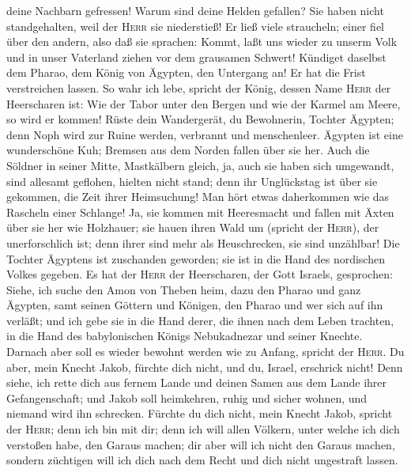 deine Nachbarn gefressen!  Warum sind deine Helden
gefallen? Sie haben nicht standgehalten, weil der \textsc{Herr} sie
niederstieß!  Er ließ viele straucheln; einer fiel über
den andern, also daß sie sprachen: Kommt, laßt uns wieder zu unserm Volk
und in unser Vaterland ziehen vor dem grausamen Schwert! 
Kündiget daselbst dem Pharao, dem König von Ägypten, den Untergang an!
Er hat die Frist verstreichen lassen.  So wahr ich lebe,
spricht der König, dessen Name \textsc{Herr} der Heerscharen ist: Wie
der Tabor unter den Bergen und wie der Karmel am Meere, so wird er
kommen!  Rüste dein Wandergerät, du Bewohnerin, Tochter
Ägypten; denn Noph wird zur Ruine werden, verbrannt und menschenleer.
 Ägypten ist eine wunderschöne Kuh; Bremsen aus dem
Norden fallen über sie her.  Auch die Söldner in seiner
Mitte, Mastkälbern gleich, ja, auch sie haben sich umgewandt, sind
allesamt geflohen, hielten nicht stand; denn ihr Unglückstag ist über
sie gekommen, die Zeit ihrer Heimsuchung!  Man hört etwas
daherkommen wie das Rascheln einer Schlange! Ja, sie kommen mit
Heeresmacht und fallen mit Äxten über sie her wie Holzhauer;
 sie hauen ihren Wald um (spricht der \textsc{Herr}), der
unerforschlich ist; denn ihrer sind mehr als Heuschrecken, sie sind
unzählbar!  Die Tochter Ägyptens ist zuschanden geworden;
sie ist in die Hand des nordischen Volkes gegeben.  Es
hat der \textsc{Herr} der Heerscharen, der Gott Israels, gesprochen:
Siehe, ich suche den Amon von Theben heim, dazu den Pharao und ganz
Ägypten, samt seinen Göttern und Königen, den Pharao und wer sich auf
ihn verläßt;  und ich gebe sie in die Hand derer, die
ihnen nach dem Leben trachten, in die Hand des babylonischen Königs
Nebukadnezar und seiner Knechte. Darnach aber soll es wieder bewohnt
werden wie zu Anfang, spricht der \textsc{Herr}.  Du
aber, mein Knecht Jakob, fürchte dich nicht, und du, Israel, erschrick
nicht! Denn siehe, ich rette dich aus fernem Lande und deinen Samen aus
dem Lande ihrer Gefangenschaft; und Jakob soll heimkehren, ruhig und
sicher wohnen, und niemand wird ihn schrecken.  Fürchte
du dich nicht, mein Knecht Jakob, spricht der \textsc{Herr}; denn ich
bin mit dir; denn ich will allen Völkern, unter welche ich dich
verstoßen habe, den Garaus machen; dir aber will ich nicht den Garaus
machen, sondern züchtigen will ich dich nach dem Recht und dich nicht
ungestraft lassen.

